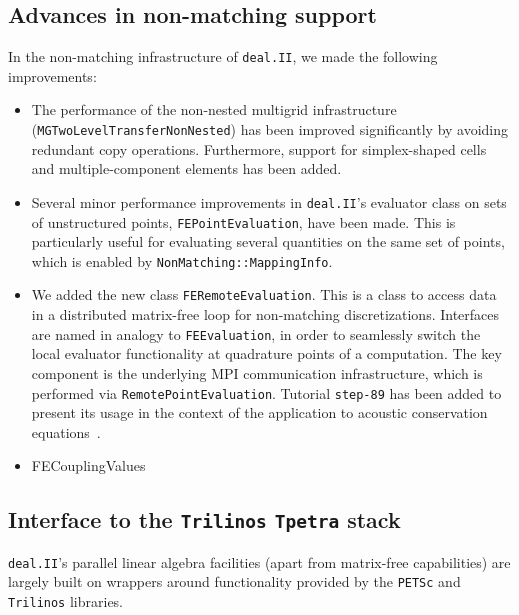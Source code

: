 \documentclass{ansarticle-preprint}
\newcommand{\specialword}[1]{\texttt{#1}}
\newcommand{\dealii}{{\specialword{deal.II}}\xspace}
\newcommand{\trilinos}{{\specialword{Trilinos}}\xspace}
\newcommand{\petsc}{\specialword{PETSc}\xspace}
\newcommand{\step}[1]{{\specialword{step-#1}}\xspace}
\newcommand{\tpetra}{{\specialword{Tpetra}}\xspace}
\begin{document}
\subsection{Advances in non-matching support}\label{sec:nonmatching}


In the non-matching infrastructure of \dealii, we made the following improvements:

\begin{itemize}
\item The performance of the non-nested multigrid infrastructure
(\texttt{MGTwoLevelTransferNon\-Nested}) has been improved significantly by avoiding
redundant copy operations. Furthermore, support for simplex-shaped cells and
multiple-component elements has been added.
\item Several minor performance improvements in \dealii's evaluator class on
  sets of unstructured points, \texttt{FEPointEvaluation}, have been
  made. This is particularly useful for evaluating several quantities on the
  same set of points, which is enabled by \texttt{NonMatching::MappingInfo}.
\item We added the new class \texttt{FERemoteEvaluation}.
This is a class to access data
in a distributed matrix-free loop for non-matching discretizations.
Interfaces are named in analogy to \texttt{FEEvaluation}, in order to seamlessly switch the
local evaluator functionality at quadrature points of a computation. The key component is the
underlying MPI communication infrastructure, which is performed via \texttt{RemotePointEvaluation}.
Tutorial \step{89} has been added to present its usage
in the context of the application to acoustic conservation equations~\cite{heinz2023high}.
\item FECouplingValues

\end{itemize}

\subsection{Interface to the \trilinos{} \tpetra{} stack}\label{sec:tpetra}

\dealii{}'s parallel linear algebra facilities (apart from matrix-free capabilities) are largely built on
wrappers around functionality provided by the \petsc{} and \trilinos{} libraries.
\end{document}

